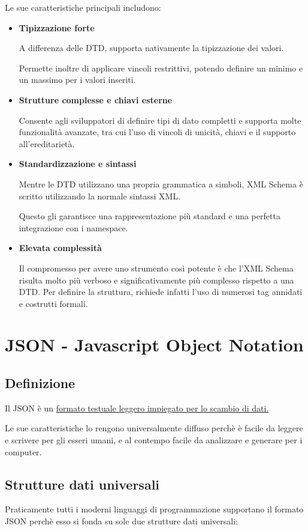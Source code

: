 Le sue caratteristiche principali includono:
\begin{itemize}
    \item \textbf{Tipizzazione forte}

    A differenza delle DTD, supporta nativamente la tipizzazione dei valori.

    Permette inoltre di applicare vincoli restrittivi, potendo definire un minimo e un massimo per i valori inseriti.
    \item \textbf{Strutture complesse e chiavi esterne}

    Consente agli sviluppatori di definire tipi di dato completti e supporta molte funzionalità avanzate, tra cui l'uso di vincoli di unicità, chiavi e il supporto all'ereditarietà.
    \item \textbf{Standardizzazione e sintassi}

    Mentre le DTD utilizzano una propria grammatica a simboli, XML Schema è scritto utilizzando la normale sintassi XML.

    Questo gli garantisce una rappresentazione più standard e una perfetta integrazione con i namespace.
    \item \textbf{Elevata complessità}
    
    Il compromesso per avere uno strumento così potente è che l'XML Schema risulta molto più verboso e significativamente più complesso rispetto a una DTD. Per definire la struttura, richiede infatti l'uso di numerosi tag annidati e costrutti formali.
\end{itemize}

\chapter{JSON - Javascript Object Notation}
\section{Definizione}
Il JSON è un \uline{formato testuale leggero impiegato per lo scambio di dati.}

Le sue caratteristiche lo rengono universalmente diffuso perchè è facile da leggere e scrivere per gli esseri umani, e al contempo facile da analizzare e generare per i computer.

\section{Strutture dati universali}
Praticamente tutti i moderni linguaggi di programmazione supportano il formato JSON perchè esso si fonda su sole due strutture dati universali:
